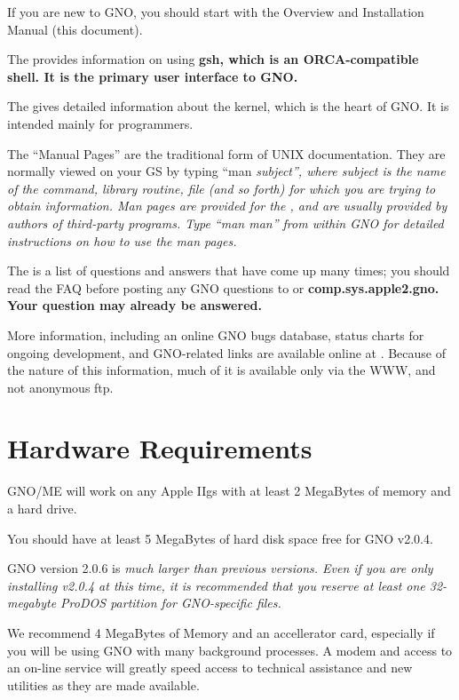 \documentclass{report}
\begin{document}
If you are new to GNO, you should start with the Overview and Installation
Manual (this document).

The  provides information on using \bf gsh\rm, 
which is an ORCA-compatible shell.  It is the primary user interface
to GNO.

The  gives detailed information about
the kernel, which is the heart of GNO.  It is intended mainly for programmers.

The ``Manual Pages'' are the traditional form of UNIX documentation.
They are normally viewed on your GS by typing ``man \it subject\rm'',
where \it subject \rm is the name of the command, library routine, file
(and so forth) for which you are trying to obtain information.
Man pages are provided for the , and are
usually provided by authors of third-party programs.  Type ``man man''
from within GNO for detailed instructions on how to use the man pages.

The  is a list of questions and answers that have come 
up many times; you should read the FAQ before posting any GNO questions
to  or \bf comp.sys.apple2.gno\rm.  Your question may
already be answered.

More information, including an online GNO bugs database, status charts
for ongoing development, and GNO-related links are available online
at .  Because of the nature of this
information, much of it is available only via the WWW, and not 
anonymous ftp.

\section{Hardware Requirements}

GNO/ME will work on any Apple IIgs with at least 2 MegaBytes of
memory and a hard drive.

You should have at least 5 MegaBytes of hard disk space free for GNO
v2.0.4.

GNO version 2.0.6 is \em much \rm larger than previous versions.
Even if you are only installing v2.0.4 at this time, it is recommended
that you reserve at least one 32-megabyte ProDOS partition for
GNO-specific files.

We recommend 4 MegaBytes of Memory and an 
accellerator card, especially if you will be using GNO with many
background processes. A modem and access to an on-line service
will greatly speed access to technical assistance and new
utilities as they are made available.
\end{document}
